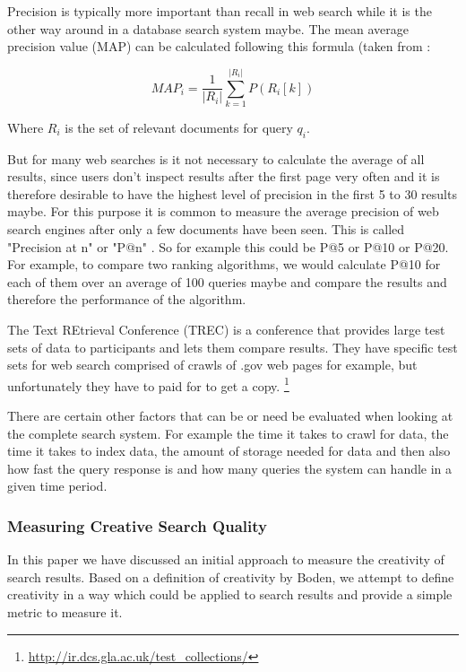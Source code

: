 Precision is typically more important than recall in web search while it is the other way around in a database search system maybe. The mean average precision value (MAP) can be calculated following this formula (taken from \citep[p.141]{Baeza-Yates2011}:

\begin{equation}
  MAP_i = \frac{1}{|R_i|} \sum_{k=1}^{|R_i|} P(R_i[k])
  \label{eq:MAP}
\end{equation}

Where $R_i$ is the set of relevant documents for query $q_i$.

But for many web searches is it not necessary to calculate the average of all results, since users don't inspect results after the first page very often and it is therefore desirable to have the highest level of precision in the first 5 to 30 results maybe. For this purpose it is common to measure the average precision of web search engines after only a few documents have been seen. This is called "Precision at n" or "P@n" \citep[p.140]{Baeza-Yates2011}. So for example this could be P@5 or P@10 or P@20. For example, to compare two ranking algorithms, we would calculate P@10 for each of them over an average of 100 queries maybe and compare the results and therefore the performance of the algorithm.

The Text REtrieval Conference (TREC) is a conference that provides large test sets of data to participants and lets them compare results. They have specific test sets for web search comprised of crawls of .gov web pages for example, but unfortunately they have to paid for to get a copy. \footnote{\url{http://ir.dcs.gla.ac.uk/test_collections/}}

There are certain other factors that can be or need be evaluated when looking at the complete search system. For example the time it takes to crawl for data, the time it takes to index data, the amount of storage needed for data and then also how fast the query response is and how many queries the system can handle in a given time period.

\subsubsection{Measuring Creative Search Quality}

In this paper \citep{Sawle2011} we have discussed an initial approach to measure the creativity of search results. Based on a definition of creativity by Boden, we attempt to define creativity in a way which could be applied to search results and provide a simple metric to measure it.

